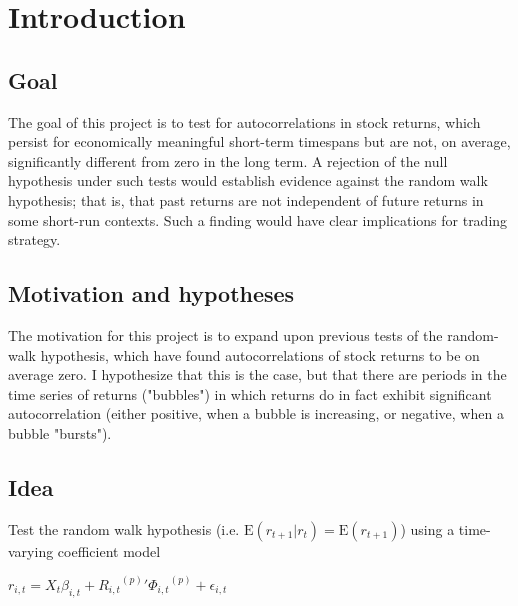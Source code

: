 \documentclass{article}
\begin{document}
\section{Introduction}

\subsection*{Goal}
The goal of this project is to test for autocorrelations in stock returns, which persist for economically meaningful short-term timespans but are not, on average, significantly different from zero in the long term. A rejection of the null hypothesis under such tests would establish evidence against the random walk hypothesis; that is, that past returns are not independent of future returns in some short-run contexts. Such a finding would have clear implications for trading strategy.

\subsection*{Motivation and hypotheses}
The motivation for this project is to expand upon previous tests of the random-walk hypothesis, which have found autocorrelations of stock returns to be on average zero. I hypothesize that this is the case, but that there are periods in the time series of returns ("bubbles") in which returns do in fact exhibit significant autocorrelation (either positive, when a bubble is increasing, or negative, when a bubble "bursts").

\subsection*{Idea}
Test the random walk hypothesis (i.e. \(\mathrm{E}(r_{t+1} | r_{t}) = \mathrm{E}(r_{t+1})\)) using a time-varying coefficient model
\newline
\begin{center}\(r_{i,t} = X_{t}\beta_{i,t} + {{R_{i,t}}^{(p)}}' {\Phi_{i,t}}^{(p)} + \epsilon_{i,t}\)\end{center}
\end{document}
